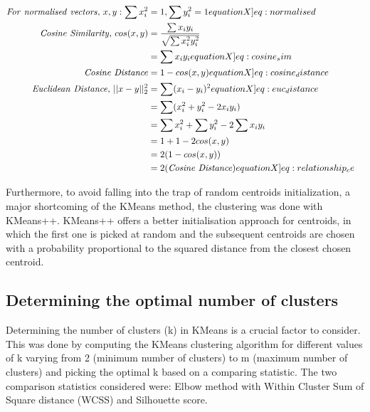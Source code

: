 \begin{align}
  \mathit{For \ normalised \ vectors,} \ x, y:  \sum x_i^2 &= 1,  \sum y_i^2 = 1 \label[equationX]{eq:normalised} &\\ 
  \mathit{Cosine \ Similarity,} \ cos(x, y) &= \frac{\sum x_i y_i}{\sqrt{\sum x_i^2 y_i^2}}  \nonumber &\\ 
   &= \sum x_i y_i \label[equationX]{eq:cosine_sim} &\\
   \mathit{Cosine \ Distance} &= 1 - cos(x, y) \label[equationX]{eq:cosine_distance} &\\
   \mathit{Euclidean \ Distance,} \ || x - y ||_2^2  &= \sum (x_i -  y_i)^2  \label[equationX]{eq:euc_distance} &\\
                 &= \sum (x_i^2 + y_i^2 - 2 x_i y_i)  \nonumber &\\
                 &= \sum x_i^2 + \sum y_i^2 - 2\sum x_i y_i   \nonumber &\\
                 &= 1 + 1 - 2 cos(x, y)  \nonumber &\\
                 &= 2 (1 - cos(x, y))  &\\
                 &= 2 (\mathit{Cosine \ Distance}) \label[equationX]{eq:relationship_ce}
\end{align}



Furthermore, to avoid falling into the trap of random centroids initialization, a major shortcoming of the KMeans method, the clustering was done with KMeans++. KMeans++ offers a better initialisation approach for centroids, in which the first one is picked at random and the subsequent centroids are chosen with a probability proportional to the squared distance from the closest chosen centroid.


\subsection{Determining the optimal number of clusters} \label{s:optimal_clusters}
Determining the number of clusters (k) in KMeans is a crucial factor to consider. This was done by computing the KMeans clustering algorithm for different values of k varying from 2 (minimum number of clusters) to m (maximum number of clusters) and picking the optimal k based on a comparing statistic. The two comparison statistics considered were: Elbow method with Within Cluster Sum of Square distance (WCSS) and Silhouette score. 

